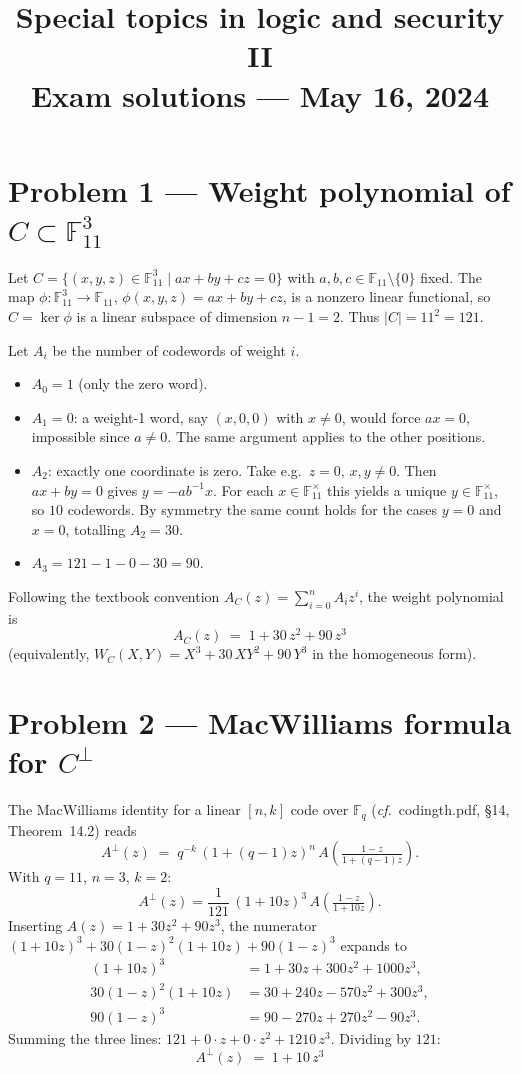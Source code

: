 \documentclass[11pt,a4paper]{article}
\title{\textbf{Special topics in logic and security II\\Exam solutions --- May 16, 2024}}
\author{}
\date{}
\newcommand{\F}{\mathbb{F}}
\begin{document}
\maketitle

\section*{Problem 1 --- Weight polynomial of $C\subset\F_{11}^3$}

Let $C=\{(x,y,z)\in\F_{11}^3\mid ax+by+cz=0\}$ with $a,b,c\in\F_{11}\setminus\{0\}$ fixed.
The map $\phi:\F_{11}^3\to\F_{11}$, $\phi(x,y,z)=ax+by+cz$, is a nonzero linear functional,
so $C=\ker\phi$ is a linear subspace of dimension $n-1=2$. Thus $|C|=11^2=121$.

Let $A_i$ be the number of codewords of weight $i$.
\begin{itemize}\setlength\itemsep{0pt}
\item $A_0=1$ (only the zero word).
\item $A_1=0$: a weight-1 word, say $(x,0,0)$ with $x\neq 0$, would force $ax=0$, impossible since $a\neq 0$. The same argument applies to the other positions.
\item $A_2$: exactly one coordinate is zero. Take e.g.\ $z=0$, $x,y\neq 0$. Then $ax+by=0$ gives $y=-ab^{-1}x$. For each $x\in\F_{11}^{\times}$ this yields a unique $y\in\F_{11}^{\times}$, so $10$ codewords. By symmetry the same count holds for the cases $y=0$ and $x=0$, totalling $A_2=30$.
\item $A_3=121-1-0-30=90$.
\end{itemize}

Following the textbook convention $A_C(z)=\sum_{i=0}^{n}A_i z^i$, the weight polynomial is
\[
\boxed{\,A_C(z)\;=\;1+30\,z^{2}+90\,z^{3}\,}
\]
(equivalently, $W_C(X,Y)=X^3+30\,XY^2+90\,Y^3$ in the homogeneous form).

\section*{Problem 2 --- MacWilliams formula for $C^{\perp}$}

The MacWilliams identity for a linear $[n,k]$ code over $\F_q$ (\textit{cf.}\ codingth.pdf, \S14, Theorem~14.2) reads
\[
A^{\perp}(z)\;=\;q^{-k}\,(1+(q-1)z)^{n}\,A\!\left(\tfrac{1-z}{1+(q-1)z}\right).
\]
With $q=11$, $n=3$, $k=2$:
\[
A^{\perp}(z)=\frac{1}{121}\,(1+10z)^{3}\,A\!\left(\tfrac{1-z}{1+10z}\right).
\]
Inserting $A(z)=1+30z^{2}+90z^{3}$, the numerator $(1+10z)^{3}+30(1-z)^{2}(1+10z)+90(1-z)^{3}$ expands to
\begin{align*}
(1+10z)^{3}&=1+30z+300z^{2}+1000z^{3},\\
30(1-z)^{2}(1+10z)&=30+240z-570z^{2}+300z^{3},\\
90(1-z)^{3}&=90-270z+270z^{2}-90z^{3}.
\end{align*}
Summing the three lines: $121+0\cdot z+0\cdot z^{2}+1210\,z^{3}$. Dividing by $121$:
\[
\boxed{\,A^{\perp}(z)\;=\;1+10\,z^{3}\,}
\]
\end{document}
